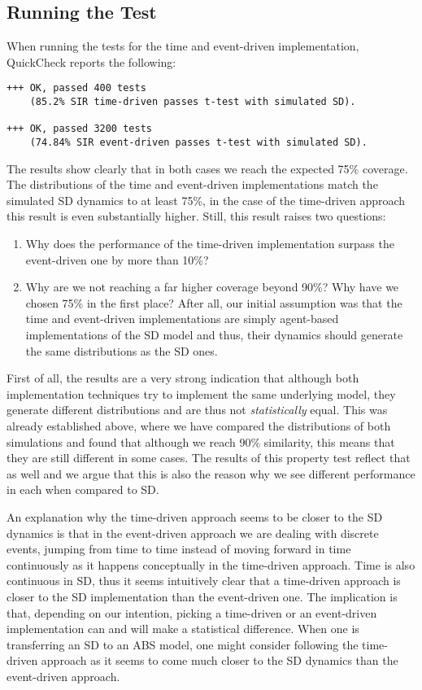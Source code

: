 \subsection{Running the Test}
When running the tests for the time and event-driven implementation, \\ QuickCheck reports the following:

\begin{verbatim}
+++ OK, passed 400 tests 
    (85.2% SIR time-driven passes t-test with simulated SD).

+++ OK, passed 3200 tests 
    (74.84% SIR event-driven passes t-test with simulated SD).
\end{verbatim}

The results show clearly that in both cases we reach the expected 75\% coverage. The distributions of the time and event-driven implementations match the simulated SD dynamics to at least 75\%, in the case of the time-driven approach this result is even substantially higher. Still, this result raises two questions:

\begin{enumerate}
	\item Why does the performance of the time-driven implementation surpass the event-driven one by more than 10\%?
	
	\item Why are we not reaching a far higher coverage beyond 90\%? Why have we chosen 75\% in the first place? After all, our initial assumption was that the time and event-driven implementations are simply agent-based implementations of the SD model and thus, their dynamics should generate the same distributions as the SD ones.	
\end{enumerate}

First of all, the results are a very strong indication that although both implementation techniques try to implement the same underlying model, they generate different distributions and are thus not \textit{statistically} equal. This was already established above, where we have compared the distributions of both simulations and found that although we reach 90\% similarity, this means that they are still different in some cases. The results of this property test reflect that as well and we argue that this is also the reason why we see different performance in each when compared to SD. 

An explanation why the time-driven approach seems to be closer to the SD dynamics is that in the event-driven approach we are dealing with discrete events, jumping from time to time instead of moving forward in time continuously as it happens conceptually in the time-driven approach. Time is also continuous in SD, thus it seems intuitively clear that a time-driven approach is closer to the SD implementation than the event-driven one. The implication is that, depending on our intention, picking a time-driven or an event-driven implementation can and will make a statistical difference. When one is transferring an SD to an ABS model, one might consider following the time-driven approach as it seems to come much closer to the SD dynamics than the event-driven approach.

